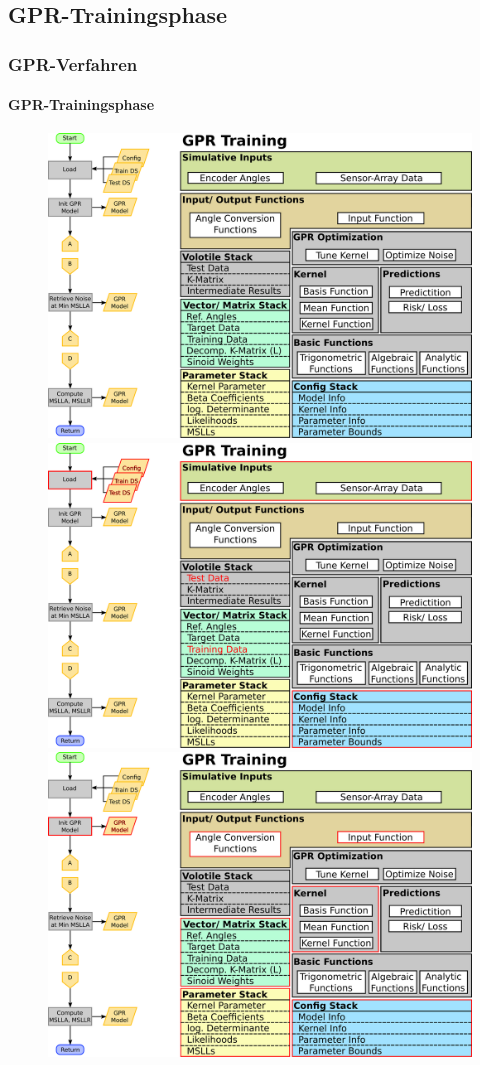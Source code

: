 \documentclass{beamer}
\begin{document}
\subsection{GPR-Trainingsphase}
\begin{frame}
\frametitle{GPR-Verfahren}
\framesubtitle{GPR-Trainingsphase}
\begin{figure}
	\begin{overprint}
		\centering\includegraphics[width=.8\linewidth]{images/GPR_Trainingsphase-1}
		\onslide<2>\centering\includegraphics[width=.8\linewidth]{images/GPR_Trainingsphase-2}
		\onslide<3>\centering\includegraphics[width=.8\linewidth]{images/GPR_Trainingsphase-3}
	\end{overprint}
\end{figure}
\end{frame}
\end{document}
